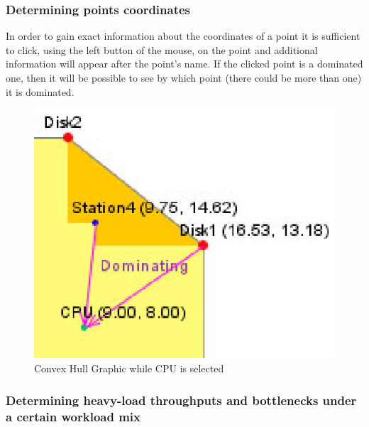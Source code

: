 \subsubsection{Determining points coordinates}

In order to gain exact information about the coordinates of a point it is sufficient to click, using the left button of the mouse, on the point and additional information will appear after the point's name. If the clicked point is a dominated one, then it will be possible to see by which point (there could be more than one) it is dominated.
\begin{figure}[htbp]
    \begin{center}
        \includegraphics[scale=.8]{img/jaba/convexHullCoordinate}
    \end{center}
    \caption{Convex Hull Graphic while CPU is selected}
    \label{fig:jaba:convexHullCoordinate}
\end{figure}

\subsubsection{Determining heavy-load throughputs and bottlenecks under a certain workload mix}

